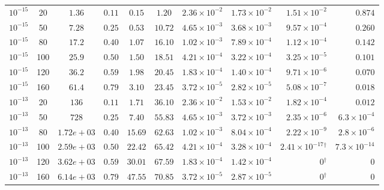 \documentclass[11pt,a4paper]{article}
\theoremstyle{plain}
\theoremstyle{remark}
\begin{document}
\begin{table}[htbp]
\begin{tabular}{lcccccccrr}
\midrule
$10^{-15}$ & 20 & $1.36$ & $0.11$ & $0.15$ & $1.20$ & $2.36\times10^{-2}$ & $1.73\times10^{-2}$ & $1.51\times10^{-2}$ & $0.874$ \\
$10^{-15}$ & 50 & $7.28$ & $0.25$ & $0.53$ & $10.72$ & $4.65\times10^{-3}$ & $3.68\times10^{-3}$ & $9.57\times10^{-4}$ & $0.260$ \\
$10^{-15}$ & 80 & $17.2$ & $0.40$ & $1.07$ & $16.10$ & $1.02\times10^{-3}$ & $7.89\times10^{-4}$ & $1.12\times10^{-4}$ & $0.142$ \\
$10^{-15}$ & 100 & $25.9$ & $0.50$ & $1.50$ & $18.51$ & $4.21\times10^{-4}$ & $3.22\times10^{-4}$ & $3.25\times10^{-5}$ & $0.101$ \\
$10^{-15}$ & 120 & $36.2$ & $0.59$ & $1.98$ & $20.45$ & $1.83\times10^{-4}$ & $1.40\times10^{-4}$ & $9.71\times10^{-6}$ & $0.070$ \\
$10^{-15}$ & 160 & $61.4$ & $0.79$ & $3.10$ & $23.45$ & $3.72\times10^{-5}$ & $2.82\times10^{-5}$ & $5.08\times10^{-7}$ & $0.018$ \\
\midrule
$10^{-13}$ & 20 & $136$ & $0.11$ & $1.71$ & $36.10$ & $2.36\times10^{-2}$ & $1.53\times10^{-2}$ & $1.82\times10^{-4}$ & $0.012$ \\
$10^{-13}$ & 50 & $728$ & $0.25$ & $7.40$ & $55.83$ & $4.65\times10^{-3}$ & $3.72\times10^{-3}$ & $2.35\times10^{-6}$ & $6.3\times10^{-4}$ \\
$10^{-13}$ & 80 & $1.72e+03$ & $0.40$ & $15.69$ & $62.63$ & $1.02\times10^{-3}$ & $8.04\times10^{-4}$ & $2.22\times10^{-9}$ & $2.8\times10^{-6}$ \\
$10^{-13}$ & 100 & $2.59e+03$ & $0.50$ & $22.42$ & $65.42$ & $4.21\times10^{-4}$ & $3.28\times10^{-4}$ & $2.41\times10^{-17}$$^{\dagger}$ & $7.3\times10^{-14}$ \\
$10^{-13}$ & 120 & $3.62e+03$ & $0.59$ & $30.01$ & $67.59$ & $1.83\times10^{-4}$ & $1.42\times10^{-4}$ & $0$$^{\dagger}$ & $0$ \\
$10^{-13}$ & 160 & $6.14e+03$ & $0.79$ & $47.55$ & $70.85$ & $3.72\times10^{-5}$ & $2.87\times10^{-5}$ & $0$$^{\dagger}$ & $0$ \\

\bottomrule
\end{tabular}
\end{table}
\end{document}
